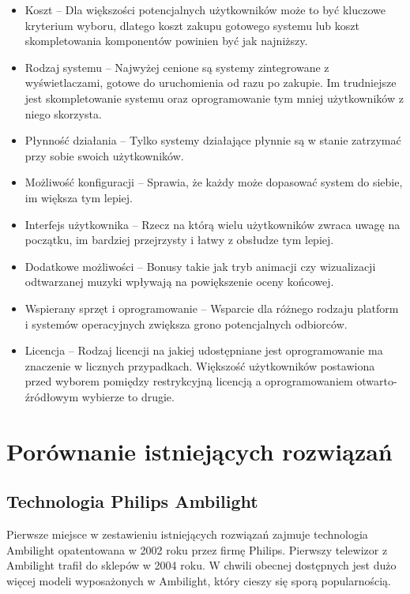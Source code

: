 \documentclass[12pt]{report}
\begin{document}
\begin{itemize}
	\item Koszt -- Dla większości potencjalnych użytkowników może to być kluczowe kryterium wyboru, dlatego koszt zakupu gotowego systemu lub koszt skompletowania komponentów powinien być jak najniższy.
	\item Rodzaj systemu -- Najwyżej cenione są systemy zintegrowane z wyświetlaczami, gotowe do uruchomienia od razu po zakupie. Im trudniejsze jest skompletowanie systemu oraz oprogramowanie tym mniej użytkowników z niego skorzysta.
	\item Płynność działania -- Tylko systemy działające płynnie są w stanie zatrzymać przy sobie swoich użytkowników.
	\item Możliwość konfiguracji -- Sprawia, że każdy może dopasować system do siebie, im większa tym lepiej.
	\item Interfejs użytkownika -- Rzecz na którą wielu użytkowników zwraca uwagę na początku, im bardziej przejrzysty i łatwy z obsłudze tym lepiej.
	\item Dodatkowe możliwości -- Bonusy takie jak tryb animacji czy wizualizacji odtwarzanej muzyki wpływają na powiększenie oceny końcowej.
	\item Wspierany sprzęt i oprogramowanie -- Wsparcie dla różnego rodzaju platform i systemów operacyjnych zwiększa grono potencjalnych odbiorców.
	\item Licencja -- Rodzaj licencji na jakiej udostępniane jest oprogramowanie ma znaczenie w licznych przypadkach. Większość użytkowników postawiona przed wyborem pomiędzy restrykcyjną licencją a oprogramowaniem otwarto-źródłowym wybierze to drugie.
\end{itemize} 

\section{Porównanie istniejących rozwiązań} \label{por}

\subsection{Technologia Philips Ambilight}

Pierwsze miejsce w zestawieniu istniejących rozwiązań zajmuje technologia Ambilight opatentowana w 2002 roku przez firmę Philips. Pierwszy telewizor z Ambilight trafił do sklepów w 2004 roku. W chwili obecnej dostępnych jest dużo więcej modeli wyposażonych w Ambilight, który cieszy się sporą popularnością.
\end{document}
